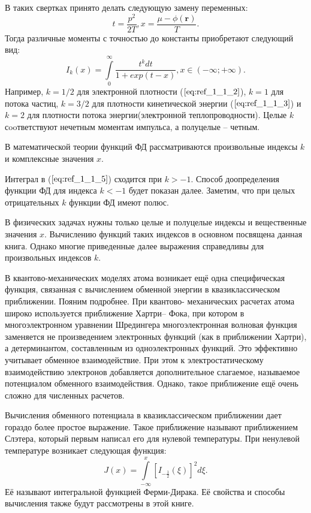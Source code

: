В таких свертках принято делать следующую замену переменных:
\begin{equation}
t = \frac{p^2}{2T}, x = \frac{\mu - \phi(\textbf{r})}{T}.
\label{eq:ref_1_1_4}
\end{equation}
Тогда различные моменты с точностью до константы приобретают следующий вид:
\begin{equation}
I_k(x)=\int\limits_0^{\infty} \frac{t^kdt}{1+exp(t-x)}, x \in (-\infty ;+\infty).
\label{eq:ref_1_1_5}
\end{equation}
Например, $k = 1/2$ для электронной плотности ($\ref{eq:ref_1_1_2}$), $k = 1$ для потока частиц, $k = 3/2$ для плотности кинетической энергии ($\ref{eq:ref_1_1_3}$) и $k = 2$ для плотности потока энергии(электронной теплопроводности). Целые $k$ сooтветствуют нечетным моментам импульса, а полуцелые – четным.

В математической теории функций ФД рассматриваются произвольные индексы $k$ и комплексные значения $x$.

Интеграл в ($\ref{eq:ref_1_1_5}$) сходится при $k > -1$. Способ доопределения функции ФД для индекса $k < -1$ будет показан далее. Заметим, что при целых отрицательных $k$ функции ФД имеют полюс.

В физических задачах нужны только целые и полуцелые индексы и вещественные значения $x$. Вычислению функций таких индексов в основном посвящена данная книга. Однако многие приведенные далее выражения справедливы для произвольных индексов $k$.

В квантово-механических моделях атома возникает ещё одна
специфическая функция, связанная с вычислением обменной энергии в
квазиклассическом приближении. Пояним подробнее. При квантово-
механических расчетах атома широко используется приближение Хартри–
Фока, при котором в многоэлектронном уравнении Шредингера многоэлектронная волновая функция заменяется не произведением электронных функций (как в приближении Хартри), а детерминантом,
составленным из одноэлектронных функций. Это эффективно учитывает
обменное взаимодействие. При этом к электростатическому взаимодействию
электронов добавляется дополнительное слагаемое, называемое потенциалом
обменного взаимодействия. Однако, такое приближение ещё очень сложно для
численных расчетов.

Вычисления обменного потенциала в квазиклассическом приближении
дает гораздо более простое выражение. Такое приближение называют
приближением Слэтера, который первым написал его для нулевой
температуры. При ненулевой температуре возникает следующая функция:
\begin{equation}
J(x)=\int\limits_{-\infty}^x [I_{-\frac{1}{2}}(\xi)]^2d\xi.
\label{eq:ref_1_1_6}
\end{equation}
Её называют интегральной функцией Ферми-Дирака. Её свойства и способы вычисления также будут рассмотрены в этой книге. 
\\


